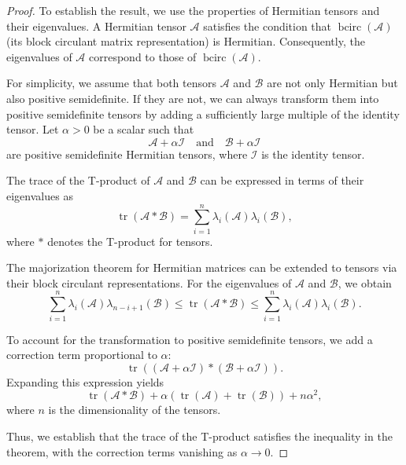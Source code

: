\documentclass[oupthm]{CUP-JNL-BCM}%
\theoremstyle{oupplain}
\theoremstyle{oupdefinition}
\theoremstyle{oupremark}
\theoremstyle{oupproof}
\newtheorem{proof}{Proof}
\numberwithin{equation}{section}
\begin{document}
\begin{proof}
    To establish the result, we use the properties of Hermitian tensors and their eigenvalues. A Hermitian tensor $\mathcal{A}$ satisfies the condition that $\operatorname{bcirc}(\mathcal{A})$ (its block circulant matrix representation) is Hermitian. Consequently, the eigenvalues of $\mathcal{A}$ correspond to those of $\operatorname{bcirc}(\mathcal{A})$.

  \noindent  For simplicity, we assume that both tensors $\mathcal{A}$ and $\mathcal{B}$ are not only Hermitian but also positive semidefinite. If they are not, we can always transform them into positive semidefinite tensors by adding a sufficiently large multiple of the identity tensor. Let $\alpha > 0$ be a scalar such that
    \[
    \mathcal{A} + \alpha \mathcal{I} \quad \text{and} \quad \mathcal{B} + \alpha \mathcal{I}
    \]
    are positive semidefinite Hermitian tensors, where $\mathcal{I}$ is the identity tensor.

   \noindent The trace of the T-product of $\mathcal{A}$ and $\mathcal{B}$ can be expressed in terms of their eigenvalues as
    \[
    \operatorname{tr}(\mathcal{A} * \mathcal{B}) = \sum_{i=1}^n \lambda_i(\mathcal{A}) \lambda_i(\mathcal{B}),
    \]
    where $*$ denotes the T-product for tensors.

   \noindent The majorization theorem for Hermitian matrices can be extended to tensors via their block circulant representations. For the eigenvalues of $\mathcal{A}$ and $\mathcal{B}$, we obtain
    \[
    \sum_{i=1}^n \lambda_i(\mathcal{A}) \lambda_{n-i+1}(\mathcal{B}) \leq \operatorname{tr}(\mathcal{A} * \mathcal{B}) \leq \sum_{i=1}^n \lambda_i(\mathcal{A}) \lambda_i(\mathcal{B}).
    \]

    \noindent To account for the transformation to positive semidefinite tensors, we add a correction term proportional to $\alpha$:
    \[
    \operatorname{tr}((\mathcal{A} + \alpha \mathcal{I}) * (\mathcal{B} + \alpha \mathcal{I})).
    \]
    Expanding this expression yields
    \[
    \operatorname{tr}(\mathcal{A} * \mathcal{B}) + \alpha (\operatorname{tr}(\mathcal{A}) + \operatorname{tr}(\mathcal{B})) + n \alpha^2,
    \]
    where $n$ is the dimensionality of the tensors.

    \noindent Thus, we establish that the trace of the T-product satisfies the inequality in the theorem, with the correction terms vanishing as $\alpha \to 0$.

\end{proof}
\end{document}
